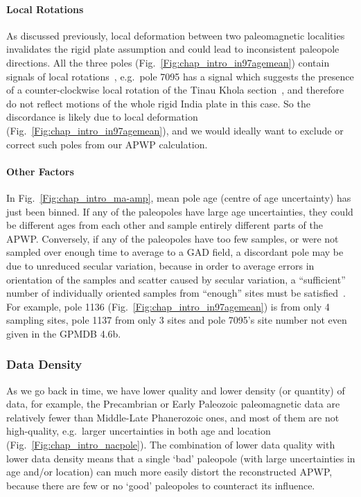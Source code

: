 \paragraph{Local Rotations}

As discussed previously, local deformation between two paleomagnetic localities
invalidates the rigid plate assumption and could lead to inconsistent paleopole
directions. All the three poles (Fig.~\ref{Fig:chap_intro_in97agemean})
contain signals of local rotations~\citep{O82,G94}, e.g.\ pole 7095 has a signal
which suggests the presence of a counter-clockwise local rotation of the Tinau
Khola section~\citep{G94}, and therefore do not reflect motions of the whole
rigid India plate in this case. So the discordance is likely due to local
deformation (Fig.~\ref{Fig:chap_intro_in97agemean}), and we would ideally
want to exclude or correct such poles from our APWP calculation.

\paragraph{Other Factors}

In Fig.~\ref{Fig:chap_intro_ma-amp}, mean pole age (centre of age uncertainty)
has just been binned. If any of the paleopoles have large age uncertainties,
they could be different ages from each other and sample entirely different parts
of the APWP\@. Conversely, if any of the paleopoles have too few samples, or
were not sampled over enough time to average to a GAD field, a discordant pole
may be due to unreduced secular variation, because in order to average errors in
orientation of the samples and scatter caused by secular variation, a
``sufficient'' number of individually oriented samples from ``enough'' sites
must be satisfied~\citep{T19,v90,B02}. For example, pole 1136
(Fig.~\ref{Fig:chap_intro_in97agemean}) is from only 4 sampling sites, pole 1137
from only 3 sites and pole 7095's site number not even given in the GPMDB 4.6b.

\subsubsection{Data Density}\label{sec:datden}

As we go back in time, we have lower quality and lower density (or quantity) of
data, for example, the Precambrian or Early Paleozoic paleomagnetic data are
relatively fewer than Middle-Late Phanerozoic ones, and most of them are not
high-quality, e.g.\ larger uncertainties in both age and location
(Fig.~\ref{Fig:chap_intro_nacpole}). The combination of lower data quality with
lower data density means that a single `bad' paleopole (with large uncertainties
in age and/or location) can much more easily distort the reconstructed APWP,
because there are few or no `good' paleopoles to counteract its influence.

